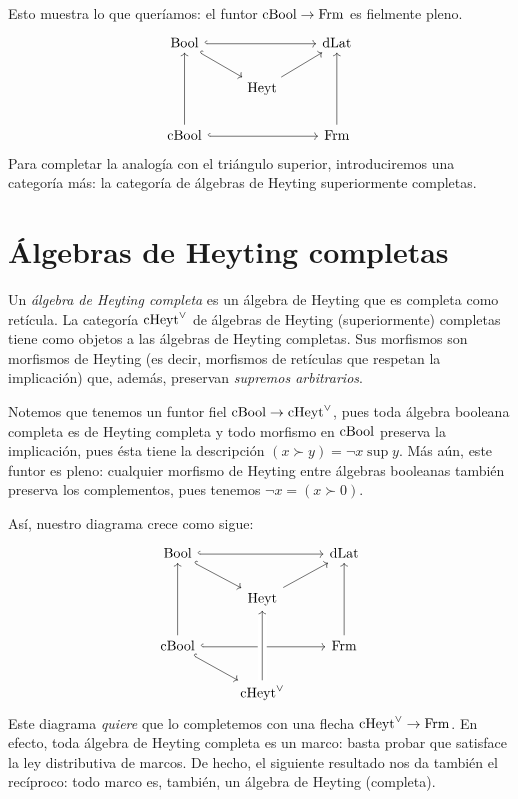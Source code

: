 Esto muestra lo que queríamos: el funtor $\mathrm{cBool}\to\mathrm{Frm}$ es fielmente
pleno.
\begin{equation}\label{diag:cuadrado-cba-frm}
\begin{tikzcd}
  \Bool \ar[dr,hook] \ar[rr,hook] &               & \DLat \\
                                  & \Heyt \ar[ur]         \\
  \CBA \ar[uu] \ar[rr,hook] &           & \Frm \ar[uu]
\end{tikzcd}
\end{equation}
Para completar la analogía con el triángulo superior, introduciremos
una categoría más: la categoría de álgebras de Heyting superiormente
completas.

\section{Álgebras de Heyting completas}

\begin{definition}\label{heyt}
  Un \emph{álgebra de Heyting completa} es un álgebra de Heyting que es
  completa como retícula.
  La categoría $\mathrm{cHeyt}^\vee$ de álgebras de Heyting (superiormente)
  completas tiene como objetos a las álgebras de Heyting completas.
  Sus morfismos son morfismos de Heyting (es decir, morfismos de
  retículas que respetan la implicación) que, además, preservan
  \emph{supremos arbitrarios}.
\end{definition}

Notemos que tenemos un funtor fiel $\mathrm{cBool}\to\mathrm{cHeyt}^\vee$, pues toda
álgebra booleana completa es de Heyting completa y todo
morfismo en $\mathrm{cBool}$ preserva la implicación, pues ésta tiene la
descripción $(x\succ y)=\neg x\sup y$.
Más aún, este funtor es pleno: cualquier morfismo de Heyting
entre álgebras booleanas también preserva los complementos, pues
tenemos $\neg x = (x\succ 0)$.

Así, nuestro diagrama crece como sigue:
\begin{equation}\label{diag:prisma-cheyt-incompleto}
\begin{tikzcd}
  \Bool \ar[dr,hook] \ar[rr,hook] &               & \DLat \\
                                  & \Heyt \ar[ur]         \\
  \CBA \ar[uu] \ar[rr,hook] \ar[dr,hook] & & \Frm \ar[uu]    \\
                            & \cHeyt \ar[uu,crossing over]
\end{tikzcd}
\end{equation}
Este diagrama \emph{quiere} que lo completemos con una flecha
$\mathrm{cHeyt}^\vee\to\mathrm{Frm}$. En efecto, toda álgebra de Heyting completa es un
marco: basta probar que satisface la ley distributiva de marcos. De
hecho, el siguiente resultado nos da también el recíproco: todo marco
es, también, un álgebra de Heyting (completa).

